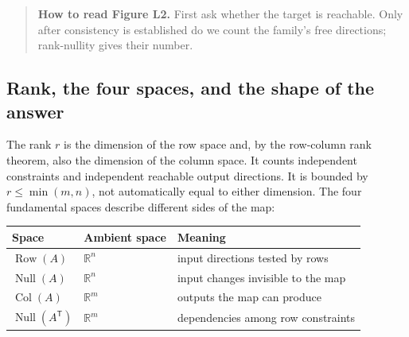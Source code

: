 
\begin{quote}
\textbf{How to read Figure L2.} First ask whether the target is reachable. Only after consistency is established do we count the family's free directions; rank-nullity gives their number.
\end{quote}

\subsection{Rank, the four spaces, and the shape of the answer}\label{01-foundations-i-ch019-rank-the-four-spaces-and-the-shape-of-the-answer}

\hypertarget{01-foundations-i-ch019-rank-the-four-spaces-and-the-shape-of-the-answer}{}

The rank \(r\) is the dimension of the row space and, by the row-column rank theorem, also the dimension of the column space. It counts independent constraints and independent reachable output directions. It is bounded by \(r\le\min(m,n)\), not automatically equal to either dimension. The four fundamental spaces describe different sides of the map:

{\def\LTcaptype{none} %
\begin{longtable}[]{@{}
  >{\raggedright\arraybackslash}p{}
  >{\raggedleft\arraybackslash}p{}
  >{\raggedright\arraybackslash}p{}@{}}
\toprule\noalign{}
\begin{minipage}[b]{\linewidth}\raggedright
Space
\end{minipage} & \begin{minipage}[b]{\linewidth}\raggedleft
Ambient space
\end{minipage} & \begin{minipage}[b]{\linewidth}\raggedright
Meaning
\end{minipage} \\
\midrule\noalign{}
\endhead
\bottomrule\noalign{}
\endlastfoot
\(\operatorname{Row}(A)\) & \(\mathbb R^n\) & input directions tested by rows \\
\(\operatorname{Null}(A)\) & \(\mathbb R^n\) & input changes invisible to the map \\
\(\operatorname{Col}(A)\) & \(\mathbb R^m\) & outputs the map can produce \\
\(\operatorname{Null}(A^\mathsf T)\) & \(\mathbb R^m\) & dependencies among row constraints \\
\end{longtable}
}

